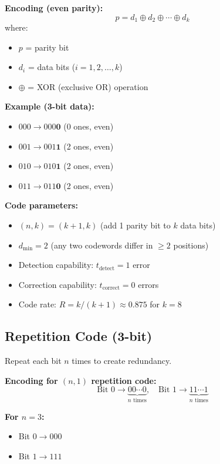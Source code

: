 \textbf{Encoding (even parity):}
\begin{equation}
p = d_1 \oplus d_2 \oplus \cdots \oplus d_k
\label{eq:parity-even}
\end{equation}
where:
\begin{itemize}
\item $p$ = parity bit
\item $d_i$ = data bits ($i = 1, 2, \ldots, k$)
\item $\oplus$ = XOR (exclusive OR) operation
\end{itemize}

\textbf{Example (3-bit data):}
\begin{itemize}
\item $000 \rightarrow 000\mathbf{0}$ (0 ones, even)
\item $001 \rightarrow 001\mathbf{1}$ (2 ones, even)
\item $010 \rightarrow 010\mathbf{1}$ (2 ones, even)
\item $011 \rightarrow 011\mathbf{0}$ (2 ones, even)
\end{itemize}

\textbf{Code parameters:}
\begin{itemize}
\item $(n, k) = (k+1, k)$ (add 1 parity bit to $k$ data bits)
\item $d_{\min} = 2$ (any two codewords differ in $\geq 2$ positions)
\item Detection capability: $t_{\text{detect}} = 1$ error
\item Correction capability: $t_{\text{correct}} = 0$ errors
\item Code rate: $R = k/(k+1) \approx 0.875$ for $k=8$
\end{itemize}

\subsection{Repetition Code (3-bit)}

Repeat each bit $n$ times to create redundancy.

\textbf{Encoding for $(n, 1)$ repetition code:}
\begin{equation}
\text{Bit } 0 \rightarrow \underbrace{00\cdots0}_{n \text{ times}}, \quad \text{Bit } 1 \rightarrow \underbrace{11\cdots1}_{n \text{ times}}
\label{eq:repetition}
\end{equation}

\textbf{For $n = 3$:}
\begin{itemize}
\item Bit $0 \rightarrow 000$
\item Bit $1 \rightarrow 111$
\end{itemize}

